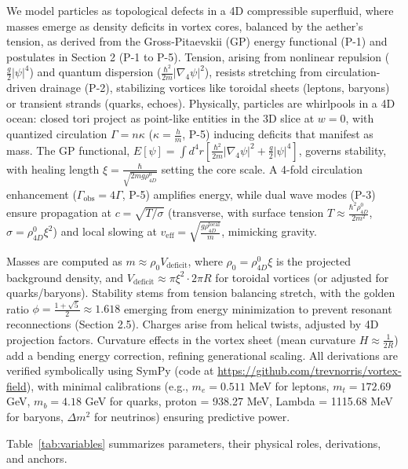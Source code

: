We model particles as topological defects in a 4D compressible superfluid, where masses emerge as density deficits in vortex cores, balanced by the aether's tension, as derived from the Gross-Pitaevskii (GP) energy functional (P-1) and postulates in Section 2 (P-1 to P-5). Tension, arising from nonlinear repulsion (\(\frac{g}{2} |\psi|^4\)) and quantum dispersion (\(\frac{\hbar^2}{2m} |\nabla_4 \psi|^2\)), resists stretching from circulation-driven drainage (P-2), stabilizing vortices like toroidal sheets (leptons, baryons) or transient strands (quarks, echoes). Physically, particles are whirlpools in a 4D ocean: closed tori project as point-like entities in the 3D slice at \(w=0\), with quantized circulation \(\Gamma = n \kappa\) (\(\kappa = \frac{h}{m}\), P-5) inducing deficits that manifest as mass. The GP functional, \(E[\psi] = \int d^4 r \left[ \frac{\hbar^2}{2 m} |\nabla_4 \psi|^2 + \frac{g}{2} |\psi|^4 \right]\), governs stability, with healing length \(\xi = \frac{\hbar}{\sqrt{2 m g \rho_{4D}^0}}\) setting the core scale. A 4-fold circulation enhancement (\(\Gamma_{\text{obs}} = 4\Gamma\), P-5) amplifies energy, while dual wave modes (P-3) ensure propagation at \(c = \sqrt{T / \sigma}\) (transverse, with surface tension \(T \approx \frac{\hbar^2 \rho_{4D}^0}{2 m^2}\), \(\sigma = \rho_{4D}^0 \xi^2\)) and local slowing at \(v_{\text{eff}} = \sqrt{\frac{g \rho_{4D}^{\text{local}}}{m}}\), mimicking gravity.

Masses are computed as \(m \approx \rho_0 V_{\text{deficit}}\), where \(\rho_0 = \rho_{4D}^0 \xi\) is the projected background density, and \(V_{\text{deficit}} \approx \pi \xi^2 \cdot 2\pi R\) for toroidal vortices (or adjusted for quarks/baryons). Stability stems from tension balancing stretch, with the golden ratio \(\phi = \frac{1 + \sqrt{5}}{2} \approx 1.618\) emerging from energy minimization to prevent resonant reconnections (Section 2.5). Charges arise from helical twists, adjusted by 4D projection factors. Curvature effects in the vortex sheet (mean curvature \(H \approx \frac{1}{2R}\)) add a bending energy correction, refining generational scaling. All derivations are verified symbolically using SymPy (code at \url{https://github.com/trevnorris/vortex-field}), with minimal calibrations (e.g., \(m_e = 0.511\) MeV for leptons, \(m_t = 172.69\) GeV, \(m_b = 4.18\) GeV for quarks, proton = 938.27 MeV, Lambda = 1115.68 MeV for baryons, \(\Delta m^2\) for neutrinos) ensuring predictive power.

Table~\ref{tab:variables} summarizes parameters, their physical roles, derivations, and anchors.

